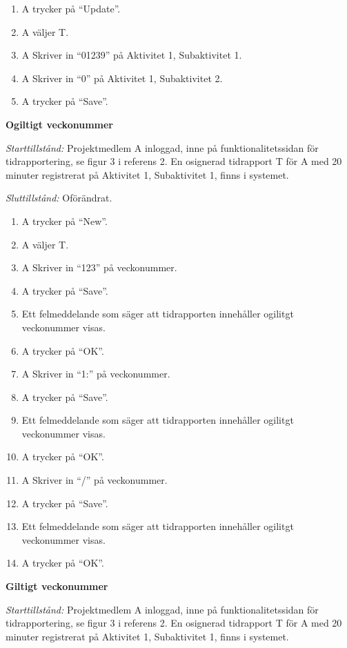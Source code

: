 \documentclass[a4paper]{article}
\begin{document}
\begin{FT}
\begin{enumerate}
 \item A trycker på ``Update''.
 \item A väljer T.
 \item A Skriver in ``01239'' på Aktivitet 1, Subaktivitet 1.
 \item A Skriver in ``0'' på Aktivitet 1, Subaktivitet 2.
 \item A trycker på ``Save''.
\end{enumerate}

\item\textbf{Ogiltigt veckonummer}

\emph{Starttillstånd:} Projektmedlem A inloggad, inne på funktionalitetssidan för tidrapportering, se figur 3 i referens 2. En osignerad tidrapport T för A med 20 minuter registrerat på Aktivitet 1, Subaktivitet 1, finns i systemet.

\emph{Sluttillstånd:} Oförändrat.

\begin{enumerate}
\item A trycker på ``New''.
\item A väljer T.
\item A Skriver in ``123'' på veckonummer.
\item A trycker på ``Save''.
\item Ett felmeddelande som säger att tidrapporten innehåller ogilitgt veckonummer visas.
\item A trycker på ``OK''.
\item A Skriver in ``1:'' på veckonummer.
\item A trycker på ``Save''.
\item Ett felmeddelande som säger att tidrapporten innehåller ogilitgt veckonummer visas.
\item A trycker på ``OK''.
\item A Skriver in ``/'' på veckonummer.
\item A trycker på ``Save''.
\item Ett felmeddelande som säger att tidrapporten innehåller ogilitgt veckonummer visas.
\item A trycker på ``OK''.
\end{enumerate}

\item\textbf{Giltigt veckonummer}

\emph{Starttillstånd:} Projektmedlem A inloggad, inne på funktionalitetssidan för tidrapportering, se figur 3 i referens 2. En osignerad tidrapport T för A med 20 minuter registrerat på Aktivitet 1, Subaktivitet 1, finns i systemet.


\end{FT}
\end{document}
